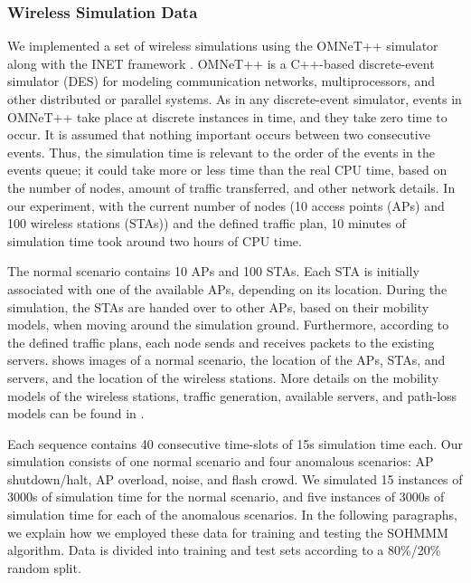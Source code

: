 \subsubsection{Wireless Simulation Data}
\label{sec:sohmmm_experiment_wifi}

We implemented a set of wireless simulations using the OMNeT++ \cite{omnetpp} simulator along with the INET framework \cite{inet}. OMNeT++ is a C++-based discrete-event simulator (DES) for modeling communication networks, multiprocessors, and other distributed or parallel systems.  
As in any discrete-event simulator, events in OMNeT++ take place at discrete instances in time, and they take zero time to occur. It is assumed that nothing important occurs between two consecutive events. Thus, the simulation time is relevant to the order of the events in the events queue; it could take more or less time than the real CPU time, based on the number of nodes, amount of traffic transferred, and other network details. In our experiment, with the current number of nodes (10 access points (APs) and 100 wireless stations (STAs)) and the defined traffic plan, 10 minutes of simulation time took around two hours of CPU time. 

The normal scenario contains 10 APs and 100 STAs. Each STA is initially associated with one of the available APs, depending on its location. During the simulation, the STAs are handed over to other APs, based on their mobility models, when moving around the simulation ground. Furthermore, according to the defined traffic plans, each node sends and receives packets to the existing servers.  shows images of a normal scenario, the location of the APs, STAs, and servers, and the location of the wireless stations. More details on the mobility models of the wireless stations, traffic generation, available servers, and path-loss models can be found in \cite{Anisa2017}.

Each sequence contains 40 consecutive time-slots of 15s simulation time each. Our simulation consists of one normal scenario and four anomalous scenarios: AP shutdown/halt, AP overload, noise, and flash crowd. We simulated 15 instances of 3000s of simulation time for the normal scenario, and five instances of 3000s of simulation time for each of the anomalous scenarios. In the following paragraphs, we explain how we employed these data for training and testing the SOHMMM algorithm.
Data is divided into training and test sets according to a 80\%/20\% random split. 

